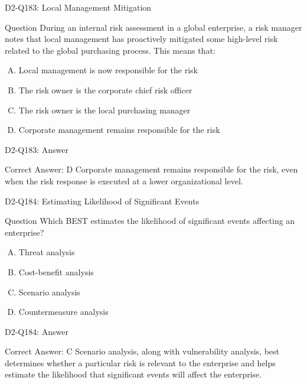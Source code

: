 \documentclass{beamer}
\begin{document}
	\begin{frame}{D2-Q183: Local Management Mitigation}
		\begin{block}{Question}
			During an internal risk assessment in a global enterprise, a risk manager notes that local management has proactively mitigated some high-level risk related to the global purchasing process. This means that:
		\end{block}
		\begin{enumerate}[(A)]
			\item Local management is now responsible for the risk
			\item The risk owner is the corporate chief risk officer
			\item The risk owner is the local purchasing manager
			\item Corporate management remains responsible for the risk
		\end{enumerate}
	\end{frame}
	\begin{frame}{D2-Q183: Answer}
		\begin{block}{Correct Answer: D}
			Corporate management remains responsible for the risk, even when the risk response is executed at a lower organizational level.
		\end{block}
	\end{frame}
	
	\begin{frame}{D2-Q184: Estimating Likelihood of Significant Events}
		\begin{block}{Question}
			Which BEST estimates the likelihood of significant events affecting an enterprise?
		\end{block}
		\begin{enumerate}[(A)]
			\item Threat analysis
			\item Cost-benefit analysis
			\item Scenario analysis
			\item Countermeasure analysis
		\end{enumerate}
	\end{frame}
	\begin{frame}{D2-Q184: Answer}
		\begin{block}{Correct Answer: C}
			Scenario analysis, along with vulnerability analysis, best determines whether a particular risk is relevant to the enterprise and helps estimate the likelihood that significant events will affect the enterprise.
		\end{block}
	\end{frame}
	
\end{document}
